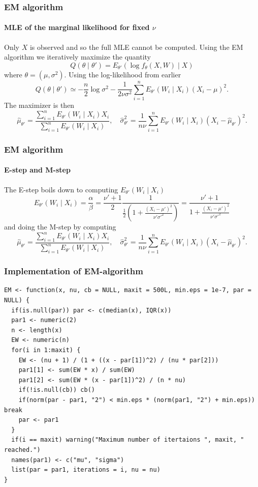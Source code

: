 \documentclass[aspectratio=169]{beamer}
\begin{document}
\begin{frame}
    \frametitle{EM algorithm}
    \framesubtitle{MLE of the marginal likelihood for fixed $\nu$}
    Only $X$ is observed and so the full MLE cannot be computed. Using the EM algorithm we iteratively maximize the quantity
    \begin{equation}
        Q(\theta\mid\theta')=E_{\theta'}(\log f_{\theta}(X, W)\mid X)
    \end{equation}
    where $\theta = (\mu,\sigma^2)$. Using the log-likelihood from earlier
    \begin{equation}
        Q(\theta\mid\theta')\simeq -\frac{n}{2}\log\sigma^{2}-\frac{1}{2\nu\sigma^{2}}\sum_{i=1}^{n}E_{\theta'}(W_{i}\mid X_{i})(X_{i}-\mu)^{2}.
    \end{equation}
    The maximizer is then
    \begin{equation*}
        \hat\mu_{\theta'} =\frac{\sum_{i=1}^{n}E_{\theta'}(W_{i}\mid X_{i})X_{i}}{\sum_{i=1}^{n}E_{\theta'}(W_{i}\mid X_{i})},\quad \hat\sigma^{2}_{\theta'}= \frac{1}{n\nu}\sum_{i=1}^{n}E_{\theta'}(W_{i}\mid X_{i})(X_{i}-\hat\mu_{\theta'})^{2}.
    \end{equation*}
\end{frame}
\begin{frame}
    \frametitle{EM algorithm}
    \framesubtitle{E-step and M-step}
    The E-step boils down to computing $E_{\theta'}(W_{i} \mid X_{i})$
    \begin{equation}
        E_{\theta'}(W_{i} \mid X_{i}) = \frac{\alpha}{\beta}=\frac{\nu' + 1}{2}\frac{1}{\frac{1}{2}\left(1 + \frac{(X_{i} - \mu')^{2}}{\nu'\sigma'^{2}}\right)}=\frac{\nu' + 1}{1 + \frac{(X_{i}- \mu')^{2}}{\nu'\sigma'^{2}}}
    \end{equation}
    and doing the M-step by computing
    \begin{equation*}
        \hat\mu_{\theta'} =\frac{\sum_{i=1}^{n}E_{\theta'}(W_{i}\mid X_{i})X_{i}}{\sum_{i=1}^{n}E_{\theta'}(W_{i}\mid X_{i})},\quad \hat\sigma^{2}_{\theta'}= \frac{1}{n\nu}\sum_{i=1}^{n}E_{\theta'}(W_{i}\mid X_{i})(X_{i}-\hat\mu_{\theta'})^{2}.
    \end{equation*}
\end{frame}
\begin{frame}[fragile]
    \frametitle{Implementation of EM-algorithm}
\begin{verbatim}
EM <- function(x, nu, cb = NULL, maxit = 500L, min.eps = 1e-7, par = NULL) {
  if(is.null(par)) par <- c(median(x), IQR(x))
  par1 <- numeric(2)
  n <- length(x)
  EW <- numeric(n)
  for(i in 1:maxit) {
    EW <- (nu + 1) / (1 + ((x - par[1])^2) / (nu * par[2]))
    par1[1] <- sum(EW * x) / sum(EW)
    par1[2] <- sum(EW * (x - par[1])^2) / (n * nu)
    if(!is.null(cb)) cb()
    if(norm(par - par1, "2") < min.eps * (norm(par1, "2") + min.eps)) break
    par <- par1
  }
  if(i == maxit) warning("Maximum number of itertaions ", maxit, " reached.")
  names(par1) <- c("mu", "sigma")
  list(par = par1, iterations = i, nu = nu)
}
\end{verbatim}
\end{frame}
\end{document}
